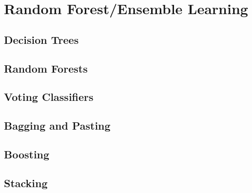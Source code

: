 
\section{Random Forest/Ensemble Learning}

\subsection{Decision Trees}

\subsection{Random Forests}

\subsection{Voting Classifiers}

\subsection{Bagging and Pasting}

\subsection{Boosting}

\subsection{Stacking}
